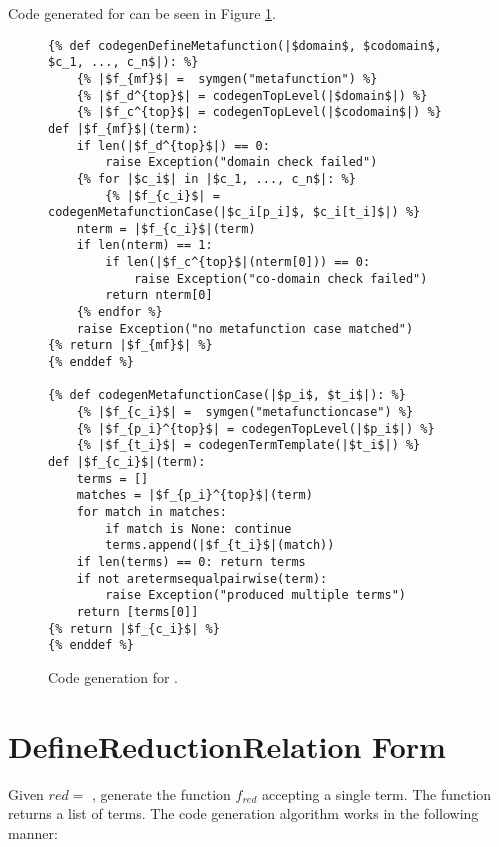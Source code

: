 Code generated for \DefineMetafunctionNoArgs \space can be seen in Figure \ref{codegen-define-metafunc}.
\begin{figure}
\begin{verbatim}
{% def codegenDefineMetafunction(|$domain$, $codomain$, $c_1, ..., c_n$|): %}
	{% |$f_{mf}$| =  symgen("metafunction") %}
	{% |$f_d^{top}$| = codegenTopLevel(|$domain$|) %}
	{% |$f_c^{top}$| = codegenTopLevel(|$codomain$|) %}
def |$f_{mf}$|(term):
	if len(|$f_d^{top}$|) == 0:
		raise Exception("domain check failed")
	{% for |$c_i$| in |$c_1, ..., c_n$|: %}
		{% |$f_{c_i}$| = codegenMetafunctionCase(|$c_i[p_i]$, $c_i[t_i]$|) %}
	nterm = |$f_{c_i}$|(term)
	if len(nterm) == 1:
		if len(|$f_c^{top}$|(nterm[0])) == 0:
			raise Exception("co-domain check failed")
		return nterm[0]
	{% endfor %}
	raise Exception("no metafunction case matched")
{% return |$f_{mf}$| %}
{% enddef %}

{% def codegenMetafunctionCase(|$p_i$, $t_i$|): %}
	{% |$f_{c_i}$| =  symgen("metafunctioncase") %}
	{% |$f_{p_i}^{top}$| = codegenTopLevel(|$p_i$|) %}
	{% |$f_{t_i}$| = codegenTermTemplate(|$t_i$|) %}
def |$f_{c_i}$|(term):
	terms = []
	matches = |$f_{p_i}^{top}$|(term)
	for match in matches:
		if match is None: continue
		terms.append(|$f_{t_i}$|(match))
	if len(terms) == 0: return terms
	if not aretermsequalpairwise(term):
		raise Exception("produced multiple terms")
	return [terms[0]]
{% return |$f_{c_i}$| %}
{% enddef %}
\end{verbatim}
\caption{Code generation for \DefineMetafunctionNoArgs.}
\label{codegen-define-metafunc}
\end{figure}

\section{DefineReductionRelation Form}
Given $red=$ \TlDefineReductionRelation, generate the function $f_{red}$ accepting a single term. The function returns a list of terms. The code generation algorithm works in the following manner:

